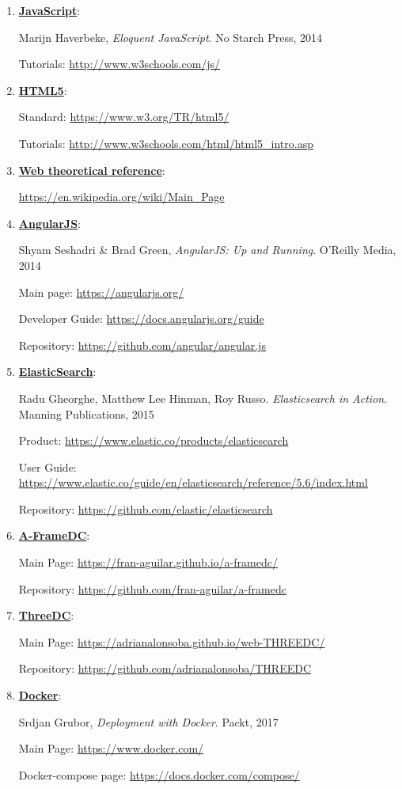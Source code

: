 \documentclass[a4paper, 12pt]{book}
\begin{document}
\begin{enumerate}
\item \underline{\textbf{JavaScript}}:

 Marijn Haverbeke, \textit{Eloquent JavaScript}. No Starch Press, 2014

Tutorials: \url{http://www.w3schools.com/js/}

\item \underline{\textbf{HTML5}}:

Standard: \url{https://www.w3.org/TR/html5/}

Tutorials: \url{http://www.w3schools.com/html/html5_intro.asp}

\item \underline{\textbf{Web theoretical reference}}: 

\url{https://en.wikipedia.org/wiki/Main_Page}

\item \underline{\textbf{AngularJS}}:

 Shyam Seshadri & Brad Green, \textit{AngularJS: Up and Running}. O'Reilly Media, 2014

Main page: \url{https://angularjs.org/}

Developer Guide: \url{https://docs.angularjs.org/guide}

Repository: \url{https://github.com/angular/angular.js}

\item \underline{\textbf{ElasticSearch}}: 

 Radu Gheorghe, Matthew Lee Hinman, Roy Russo. \textit{Elasticsearch in Action}. Manning Publications, 2015

Product: \url{https://www.elastic.co/products/elasticsearch}

User Guide: \url{https://www.elastic.co/guide/en/elasticsearch/reference/5.6/index.html}

Repository: \url{https://github.com/elastic/elasticsearch}

\item \underline{\textbf{A-FrameDC}}:

Main Page: \url{https://fran-aguilar.github.io/a-framedc/}

Repository: \url{https://github.com/fran-aguilar/a-framedc}

\item \underline{\textbf{ThreeDC}}:

Main Page: \url{https://adrianalonsoba.github.io/web-THREEDC/}

Repository: \url{https://github.com/adrianalonsoba/THREEDC}

\item \underline{\textbf{Docker}}:

Srdjan Grubor, \textit{Deployment with Docker}. Packt, 2017

Main Page: \url{https://www.docker.com/}

Docker-compose page: \url{https://docs.docker.com/compose/}

\end{enumerate}
\end{document}
